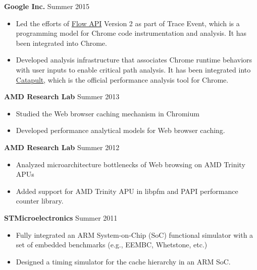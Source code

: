 \documentclass[margin, 9pt]{res} %
\begin{document}
\begin{resume}
{\textbf{Google Inc.}} \hfill{Summer 2015}\\
\vspace*{-10pt}
\begin{itemize}[leftmargin=*] \itemsep -3pt
\vspace*{-5pt}
	\item Led the efforts of
\href{https://docs.google.com/document/d/1La_0PPfsTqHJihazYhff96thhjPtvq1KjAUOJu0dvEg/edit#heading=h.46jecek204ph}{Flow
API} Version 2 as part of Trace Event, which is a programming model for Chrome
code instrumentation and analysis. It has been integrated into Chrome.
	\item Developed analysis infrastructure that associates Chrome runtime
behaviors with user inputs to enable critical path analysis. It has been integrated into \href{https://github.com/catapult-project/catapult}{Catapult}, which is the official performance analysis tool for Chrome.
\end{itemize}

\medskip
{\textbf{AMD Research Lab}} \hfill{Summer 2013}\\
\vspace*{-10pt}
\begin{itemize}[leftmargin=*] \itemsep -3pt
\vspace*{-5pt}
	\item Studied the Web browser caching mechanism in Chromium
	\item Developed performance analytical models for Web browser caching.
\end{itemize}

\medskip
{\textbf{AMD Research Lab}} \hfill{Summer 2012}\\
\vspace*{-10pt}
\begin{itemize}[leftmargin=*] \itemsep -3pt
\vspace*{-5pt}
	\item Analyzed microarchitecture bottlenecks of Web browsing on AMD Trinity APUs
	\item Added support for AMD Trinity APU in libpfm and PAPI performance counter library.
\end{itemize}

\medskip
{\textbf{STMicroelectronics}} \hfill{Summer 2011}\\
\vspace*{-10pt}
\begin{itemize}[leftmargin=*] \itemsep -3pt
\vspace*{-5pt}
	\item Fully integrated an ARM System-on-Chip (SoC) functional simulator with a set of embedded benchmarks (e.g., EEMBC, Whetstone, etc.)
	\item Designed a timing simulator for the cache hierarchy in an ARM SoC.
\end{itemize}


\end{resume}
\end{document}
